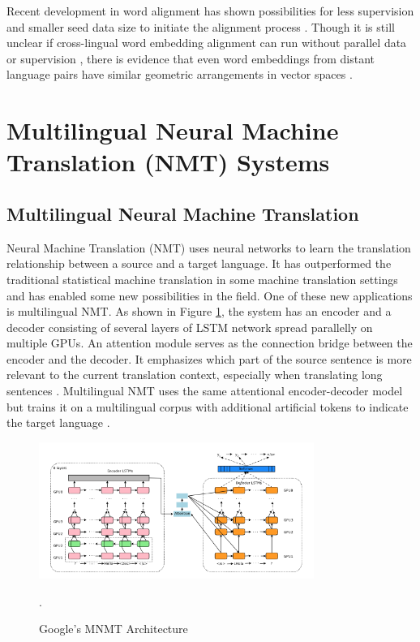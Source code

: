 \documentclass[thesis,fonts=libertine]{cluu}
\begin{document}
Recent development in word alignment has shown possibilities for less supervision and smaller seed data size to initiate the alignment process \parencite{Ruder:2019aa}. Though it is still unclear if cross-lingual word embedding alignment can run without parallel data or supervision \parencite{Dyer1365879}, there is evidence that even word embeddings from distant language pairs have similar geometric arrangements in vector spaces \parencite{Mikolov:2013ac}.

\section{Multilingual Neural Machine Translation (NMT) Systems}

\subsection{Multilingual Neural Machine Translation}

Neural Machine Translation (NMT) uses neural networks to learn the translation relationship between a source and a target language. It has outperformed the traditional statistical machine translation in some machine translation settings and has enabled some new possibilities in the field. One of these new applications is multilingual NMT. As shown in Figure \ref{fig:google_mnmt}, the system has an encoder and a decoder consisting of several layers of LSTM network spread parallelly on multiple GPUs. An attention module serves as the connection bridge between the encoder and the decoder. It emphasizes which part of the source sentence is more relevant to the current translation context, especially when translating long sentences \parencite{Wu:2016aa}. Multilingual NMT uses the same attentional encoder-decoder model but trains it on a multilingual corpus with additional artificial tokens to indicate the target language \parencite{Johnson:2016aa}.

\begin{figure}
  \centering
  \includegraphics[width=0.8\textwidth]{google_mnmt_architecture.png}
  \caption{Google's MNMT Architecture \parencite{Johnson:2016aa,Wu:2016aa}}.
  \label{fig:google_mnmt}
\end{figure}
\end{document}
